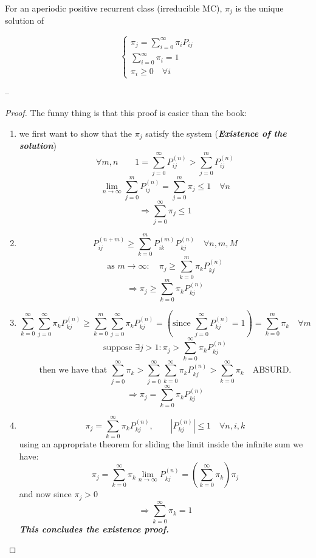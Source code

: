 \begin{theorem}
For an aperiodic positive recurrent class (irreducible MC), $\pi_j$ is the unique solution of

$$\begin{cases}
\pi_j = \sum_{i=0}^\infty \pi_i P_{ij} \\
\sum_{i=0}^\infty \pi_i = 1 \\
\pi_i \geq 0 \quad \forall i
\end{cases}$$
\end{theorem}
--
\begin{proof} The funny thing is that this proof is easier than the book:
\begin{enumerate}
\item we first want to show that the $\pi_j$ satisfy the system (\textbf{\textit{Existence of the solution}})
$$ \forall m,n \qquad 1=\sum_{j=0}^\infty P_{ij}^{(n)} > \sum_{j=0}^m P_{ij}^{(n)}$$
$$ \lim_{n\to\infty} \sum_{j=0}^m P_{ij}^{(n)} = \sum_{j=0}^m \pi_j \leq 1 \quad \forall n $$
\begin{equation}
\Rightarrow \sum_{j=0}^\infty \pi_j \leq 1
\end{equation}

\item
$$P_{ij}^{(n+m)} \geq \sum_{k=0}^m P_{ik}^{(m)} P_{kj}^{(n)} \quad \forall n, m, M$$
$$ \mbox{as } m \to \infty :\quad \pi_j \geq \sum_{k=0}^m \pi_k P_{kj}^{(n)} $$
\begin{equation}
\Rightarrow  \pi_j \geq \sum_{k=0}^m \pi_k P_{kj}^{(n)}
\end{equation}

\item
$$  \sum_{k=0}^\infty \sum_{j=0}^\infty \pi_k P_{kj}^{(n)} \geq
      \sum_{k=0}^m \sum_{j=0}^\infty \pi_k P_{kj}^{(n)}  =
      (\mbox{since } \sum_{j=0}^\infty P_{kj}^{(n)} = 1 ) =
      \sum_{k=0}^m \pi_k \quad \forall m $$
$$ \mbox{suppose } \exists j > 1 : \pi_j > \sum_{k=0}^\infty \pi_k P_{kj}^{(n)} $$
$$ \mbox{then we have that } \sum_{j=0}^\infty \pi_k > \sum_{j=0}^\infty \sum_{k=0}^\infty \pi_k P_{kj}^{(n)} > \sum_{k=0}^\infty \pi_k \quad \mbox{ABSURD.} $$
\begin{equation}
\Rightarrow \pi_j = \sum_{k=0}^\infty \pi_k P_{kj}^{(n)}
\end{equation}

\item
$$ \pi_j = \sum_{k=0}^\infty \pi_k P_{kj}^{(n)}, \qquad |P_{kj}^{(n)}| \leq 1 \quad \forall n,i,k $$
using an appropriate theorem for sliding the limit inside the infinite sum we have:
$$\pi_j = \sum_{k=0}^\infty  \pi_k \lim_{n\to\infty} P_{kj}^{(n)} = (\sum_{k=0}^\infty \pi_k) \pi_j$$
and now since $\pi_j>0$
\begin{equation}
\Rightarrow \sum_{k=0}^\infty \pi_k = 1
\end{equation}
\textbf{\textit{This concludes the existence proof.}}


\end{enumerate}
\end{proof}
